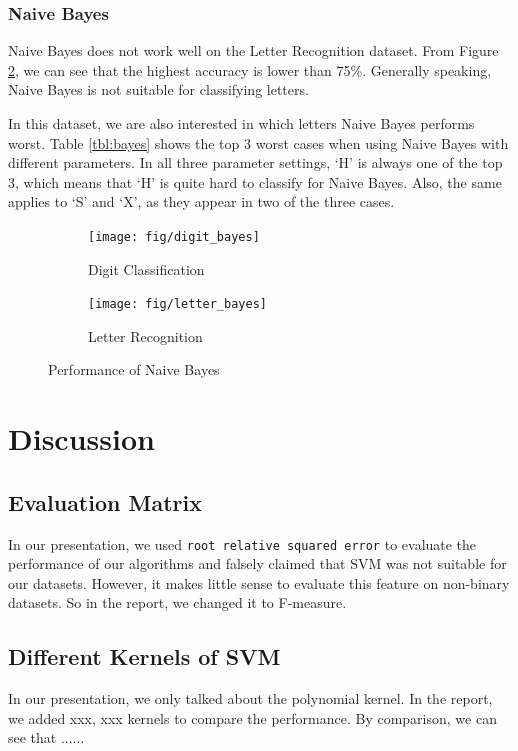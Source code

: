 \documentclass[11pt]{article}
\begin{document}
\subsubsection{Naive Bayes}
Naive Bayes does not work well on the Letter Recognition dataset. From Figure \ref{fig:letter-bayes}, we can see that the highest accuracy is lower than 75\%. Generally speaking, Naive Bayes is not suitable for classifying letters.

In this dataset, we are also interested in which letters Naive Bayes performs worst. Table \ref{tbl:bayes} shows the top 3 worst cases when using Naive Bayes with different parameters. In all three parameter settings, `H' is always one of the top 3, which means that `H' is quite hard to classify for Naive Bayes. Also, the same applies to `S' and `X', as they appear in two of the three cases.


\begin{figure}[htbp]
\centering

\begin{subfigure}[htbp]{0.46\columnwidth}
\texttt{[image: fig/digit\_bayes]}
\caption{Digit Classification}
\label{fig:digit-bayes}
\end{subfigure}
\hfill
\begin{subfigure}[htbp]{0.46\columnwidth}
\texttt{[image: fig/letter\_bayes]}
\caption{Letter Recognition}
\label{fig:letter-bayes}
\end{subfigure}
\caption{Performance of Naive Bayes}
\label{fig:bayes}
\end{figure}
\section{Discussion}

\subsection{Evaluation Matrix}
In our presentation, we used \texttt{root relative squared error} to evaluate the performance of our algorithms and falsely claimed that SVM was not suitable for our datasets. However, it makes little sense to evaluate this feature on  non-binary datasets. So in the report, we changed it to F-measure.

\subsection{Different Kernels of SVM}
In our presentation, we only talked about the polynomial kernel. In the report, we added xxx, xxx kernels to compare the performance. By comparison, we can see that ......
\end{document}
